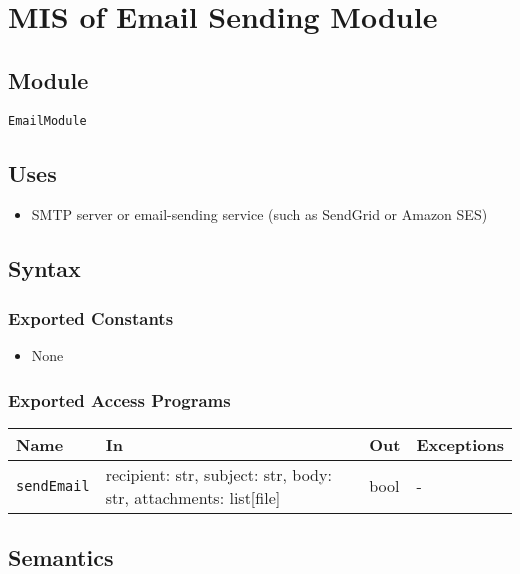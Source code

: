 \documentclass[12pt, titlepage]{article}
\begin{document}

\section{MIS of Email Sending Module} \label{mEmail}

\subsection{Module}

\texttt{EmailModule}

\subsection{Uses}

\begin{itemize}
    \item SMTP server or email-sending service (such as SendGrid or Amazon SES)
\end{itemize}

\subsection{Syntax}

\subsubsection{Exported Constants}

\begin{itemize}
    \item None
\end{itemize}

\subsubsection{Exported Access Programs}

\begin{center}
\begin{tabular}{p{5cm} p{3.5cm} p{3.5cm} p{2cm}}
\hline
\textbf{Name} & \textbf{In} & \textbf{Out} & \textbf{Exceptions} \\
\hline
\texttt{sendEmail} & recipient: str, subject: str, body: str, attachments: list[file] & bool & - \\
\hline
\end{tabular}
\end{center}

\subsection{Semantics}
\end{document}
